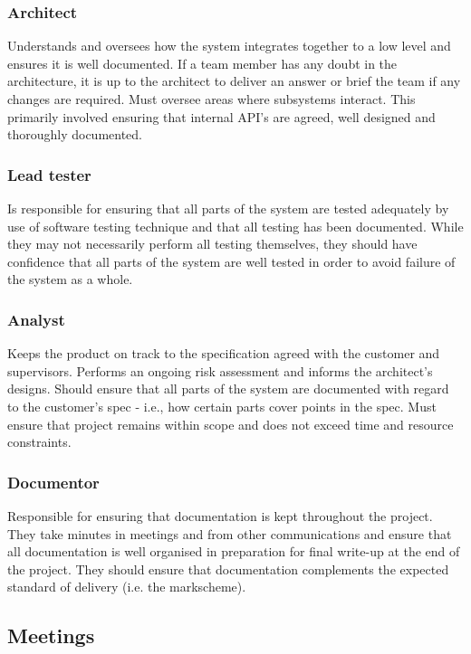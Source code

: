 \subsubsection{Architect}
Understands and oversees how the system integrates together to a low level and ensures it is well documented. If a team member has any doubt in the architecture, it is up to the architect to deliver an answer or brief the team if any changes are required. Must oversee areas where subsystems interact. This primarily involved ensuring that internal API’s are agreed, well designed and thoroughly documented.
 
\subsubsection{Lead tester}
Is responsible for ensuring that all parts of the system are tested adequately by use of software testing technique and that all testing has been documented. While they may not necessarily perform all testing themselves, they should have confidence that all parts of the system are well tested in order to avoid failure of the system as a whole.

\subsubsection{Analyst}
Keeps the product on track to the specification agreed with the customer and supervisors. Performs an ongoing risk assessment and informs the architect's designs. Should ensure that all parts of the system are documented with regard to the customer's spec - i.e., how certain parts cover points in the spec. Must ensure that project remains within scope and does not exceed time and resource constraints.

\subsubsection{Documentor}
Responsible for ensuring that documentation is kept throughout the project. They take minutes in meetings and from other communications and ensure that all documentation is well organised in preparation for final write-up at the end of the project. They should ensure that documentation complements the expected standard of delivery (i.e. the markscheme).

\subsection{Meetings}
